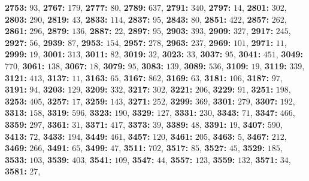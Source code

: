 \textsf{\bfseries 2753:} $93$, \textsf{\bfseries 2767:} $179$, \textsf{\bfseries 2777:} $80$, \textsf{\bfseries 2789:} $637$, \textsf{\bfseries 2791:} $340$, \textsf{\bfseries 2797:} $14$, \textsf{\bfseries 2801:} $302$, \textsf{\bfseries 2803:} $290$, \textsf{\bfseries 2819:} $43$, \textsf{\bfseries 2833:} $114$, \textsf{\bfseries 2837:} $95$, \textsf{\bfseries 2843:} $80$, \textsf{\bfseries 2851:} $422$, \textsf{\bfseries 2857:} $262$, \textsf{\bfseries 2861:} $296$, \textsf{\bfseries 2879:} $136$, \textsf{\bfseries 2887:} $22$, \textsf{\bfseries 2897:} $95$, \textsf{\bfseries 2903:} $393$, \textsf{\bfseries 2909:} $327$, \textsf{\bfseries 2917:} $245$, \textsf{\bfseries 2927:} $56$, \textsf{\bfseries 2939:} $87$, \textsf{\bfseries 2953:} $154$, \textsf{\bfseries 2957:} $278$, \textsf{\bfseries 2963:} $237$, \textsf{\bfseries 2969:} $101$, \textsf{\bfseries 2971:} $11$, \textsf{\bfseries 2999:} $19$, \textsf{\bfseries 3001:} $313$, \textsf{\bfseries 3011:} $82$, \textsf{\bfseries 3019:} $32$, \textsf{\bfseries 3023:} $33$, \textsf{\bfseries 3037:} $95$, \textsf{\bfseries 3041:} $451$, \textsf{\bfseries 3049:} $770$, \textsf{\bfseries 3061:} $138$, \textsf{\bfseries 3067:} $18$, \textsf{\bfseries 3079:} $95$, \textsf{\bfseries 3083:} $139$, \textsf{\bfseries 3089:} $536$, \textsf{\bfseries 3109:} $19$, \textsf{\bfseries 3119:} $339$, \textsf{\bfseries 3121:} $413$, \textsf{\bfseries 3137:} $11$, \textsf{\bfseries 3163:} $65$, \textsf{\bfseries 3167:} $862$, \textsf{\bfseries 3169:} $63$, \textsf{\bfseries 3181:} $106$, \textsf{\bfseries 3187:} $97$, \textsf{\bfseries 3191:} $94$, \textsf{\bfseries 3203:} $129$, \textsf{\bfseries 3209:} $332$, \textsf{\bfseries 3217:} $302$, \textsf{\bfseries 3221:} $206$, \textsf{\bfseries 3229:} $91$, \textsf{\bfseries 3251:} $198$, \textsf{\bfseries 3253:} $405$, \textsf{\bfseries 3257:} $17$, \textsf{\bfseries 3259:} $143$, \textsf{\bfseries 3271:} $252$, \textsf{\bfseries 3299:} $369$, \textsf{\bfseries 3301:} $279$, \textsf{\bfseries 3307:} $192$, \textsf{\bfseries 3313:} $158$, \textsf{\bfseries 3319:} $596$, \textsf{\bfseries 3323:} $190$, \textsf{\bfseries 3329:} $127$, \textsf{\bfseries 3331:} $230$, \textsf{\bfseries 3343:} $71$, \textsf{\bfseries 3347:} $466$, \textsf{\bfseries 3359:} $297$, \textsf{\bfseries 3361:} $31$, \textsf{\bfseries 3371:} $417$, \textsf{\bfseries 3373:} $39$, \textsf{\bfseries 3389:} $48$, \textsf{\bfseries 3391:} $19$, \textsf{\bfseries 3407:} $590$, \textsf{\bfseries 3413:} $72$, \textsf{\bfseries 3433:} $194$, \textsf{\bfseries 3449:} $461$, \textsf{\bfseries 3457:} $120$, \textsf{\bfseries 3461:} $205$, \textsf{\bfseries 3463:} $5$, \textsf{\bfseries 3467:} $212$, \textsf{\bfseries 3469:} $266$, \textsf{\bfseries 3491:} $65$, \textsf{\bfseries 3499:} $47$, \textsf{\bfseries 3511:} $702$, \textsf{\bfseries 3517:} $85$, \textsf{\bfseries 3527:} $45$, \textsf{\bfseries 3529:} $185$, \textsf{\bfseries 3533:} $103$, \textsf{\bfseries 3539:} $403$, \textsf{\bfseries 3541:} $109$, \textsf{\bfseries 3547:} $44$, \textsf{\bfseries 3557:} $123$, \textsf{\bfseries 3559:} $132$, \textsf{\bfseries 3571:} $34$, \textsf{\bfseries 3581:} $27$, 
